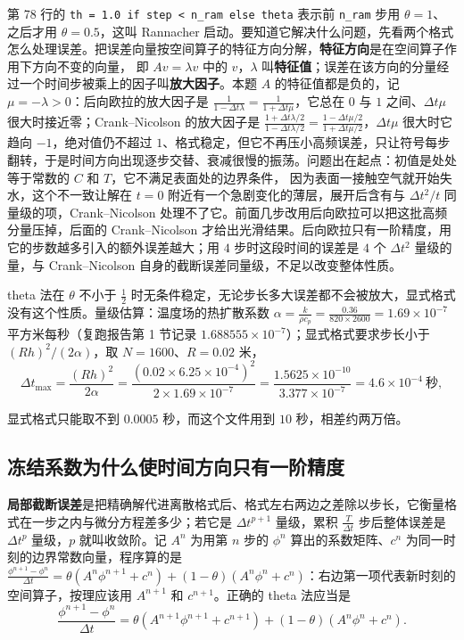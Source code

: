 第 78 行的 \texttt{th = 1.0 if step < n\_ram else theta} 表示前 \texttt{n\_ram} 步用 $\theta=1$、之后才用 $\theta=0.5$，这叫 Rannacher 启动。要知道它解决什么问题，先看两个格式怎么处理误差。把误差向量按空间算子的特征方向分解，\textbf{特征方向}是在空间算子作用下方向不变的向量，
即 $Av=\lambda v$ 中的 $v$，$\lambda$ 叫\textbf{特征值}；误差在该方向的分量经过一个时间步被乘上的因子叫\textbf{放大因子}。本题 $A$ 的特征值都是负的，记 $\mu=-\lambda>0$：后向欧拉的放大因子是 $\frac{1}{1-\Delta t\lambda}=\frac{1}{1+\Delta t\mu}$，它总在 $0$ 与 $1$ 之间、$\Delta t\mu$ 很大时接近零；Crank--Nicolson 的放大因子是
$\frac{1+\Delta t\lambda/2}{1-\Delta t\lambda/2}=\frac{1-\Delta t\mu/2}{1+\Delta t\mu/2}$，$\Delta t\mu$ 很大时它趋向 $-1$，绝对值仍不超过 $1$、格式稳定，但它不再压小高频误差，只让符号每步翻转，于是时间方向出现逐步交替、衰减很慢的振荡。问题出在起点：初值是处处等于常数的 $C$ 和 $T$，它不满足表面处的边界条件，
因为表面一接触空气就开始失水，这个不一致让解在 $t=0$ 附近有一个急剧变化的薄层，展开后含有与 $\Delta t^2/t$ 同量级的项，Crank--Nicolson 处理不了它。前面几步改用后向欧拉可以把这批高频分量压掉，后面的 Crank--Nicolson 才给出光滑结果。后向欧拉只有一阶精度，用它的步数越多引入的额外误差越大；用 $4$ 步时这段时间的误差是
$4$ 个 $\Delta t^2$ 量级的量，与 Crank--Nicolson 自身的截断误差同量级，不足以改变整体性质。

theta 法在 $\theta$ 不小于 $\frac12$ 时无条件稳定，无论步长多大误差都不会被放大，显式格式没有这个性质。量级估算：温度场的热扩散系数 $\alpha=\frac{k}{\rho c_p}=\frac{0.36}{820\times2600}=1.69\times10^{-7}$ 平方米每秒（复跑报告第 1 节记录 $1.688555\times10^{-7}$）；显式格式要求步长小于 $(Rh)^2/(2\alpha)$，取 $N=1600$、$R=0.02$ 米，
\begin{equation}
\Delta t_{\max}=\frac{(Rh)^2}{2\alpha}
=\frac{\left(0.02\times6.25\times10^{-4}\right)^2}{2\times1.69\times10^{-7}}
=\frac{1.5625\times10^{-10}}{3.377\times10^{-7}}=4.6\times10^{-4}\ \text{秒},
\end{equation}

显式格式只能取不到 $0.0005$ 秒，而这个文件用到 $10$ 秒，相差约两万倍。

\subsection{冻结系数为什么使时间方向只有一阶精度}

\textbf{局部截断误差}是把精确解代进离散格式后、格式左右两边之差除以步长，它衡量格式在一步之内与微分方程差多少；若它是 $\Delta t^{p+1}$ 量级，累积 $\frac{T}{\Delta t}$ 步后整体误差是 $\Delta t^p$ 量级，$p$ 就叫收敛阶。记 $A^n$ 为用第 $n$ 步的 $\phi^n$ 算出的系数矩阵、$c^n$ 为同一时刻的边界常数向量，程序算的是
$\frac{\phi^{n+1}-\phi^{n}}{\Delta t}=\theta\left(A^n\phi^{n+1}+c^n\right)+(1-\theta)\left(A^n\phi^{n}+c^n\right)$：右边第一项代表新时刻的空间算子，按理应该用 $A^{n+1}$ 和 $c^{n+1}$。正确的 theta 法应当是
\begin{equation}
\frac{\phi^{n+1}-\phi^{n}}{\Delta t}
=\theta\left(A^{n+1}\phi^{n+1}+c^{n+1}\right)+(1-\theta)\left(A^{n}\phi^{n}+c^{n}\right).
\label{eq:p5-exact}
\end{equation}

